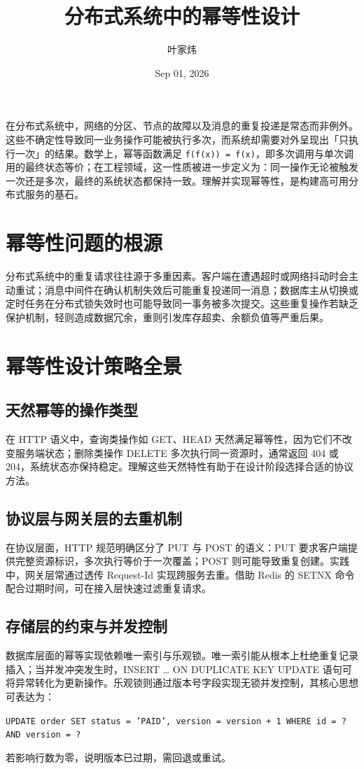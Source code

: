 \title{分布式系统中的幂等性设计}
\author{叶家炜}
\date{Sep 01, 2026}
\maketitle
在分布式系统中，网络的分区、节点的故障以及消息的重复投递是常态而非例外。这些不确定性导致同一业务操作可能被执行多次，而系统却需要对外呈现出「只执行一次」的结果。数学上，幂等函数满足 \texttt{f(f(x)) = f(x)}，即多次调用与单次调用的最终状态等价；在工程领域，这一性质被进一步定义为：同一操作无论被触发一次还是多次，最终的系统状态都保持一致。理解并实现幂等性，是构建高可用分布式服务的基石。\par
\chapter{幂等性问题的根源}
分布式系统中的重复请求往往源于多重因素。客户端在遭遇超时或网络抖动时会主动重试；消息中间件在确认机制失效后可能重复投递同一消息；数据库主从切换或定时任务在分布式锁失效时也可能导致同一事务被多次提交。这些重复操作若缺乏保护机制，轻则造成数据冗余，重则引发库存超卖、余额负值等严重后果。\par
\chapter{幂等性设计策略全景}
\section{天然幂等的操作类型}
在 HTTP 语义中，查询类操作如 GET、HEAD 天然满足幂等性，因为它们不改变服务端状态；删除类操作 DELETE 多次执行同一资源时，通常返回 404 或 204，系统状态亦保持稳定。理解这些天然特性有助于在设计阶段选择合适的协议方法。\par
\section{协议层与网关层的去重机制}
在协议层面，HTTP 规范明确区分了 PUT 与 POST 的语义：PUT 要求客户端提供完整资源标识，多次执行等价于一次覆盖；POST 则可能导致重复创建。实践中，网关层常通过透传 Request-Id 实现跨服务去重。借助 Redis 的 SETNX 命令配合过期时间，可在接入层快速过滤重复请求。\par
\section{存储层的约束与并发控制}
数据库层面的幂等实现依赖唯一索引与乐观锁。唯一索引能从根本上杜绝重复记录插入；当并发冲突发生时，INSERT … ON DUPLICATE KEY UPDATE 语句可将异常转化为更新操作。乐观锁则通过版本号字段实现无锁并发控制，其核心思想可表达为：\par
\texttt{UPDATE order SET status = 'PAID', version = version + 1 WHERE id = ? AND version = ?}\par
若影响行数为零，说明版本已过期，需回退或重试。\par

